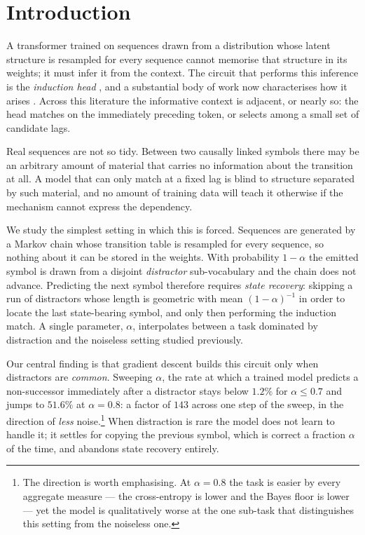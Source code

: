 \section{Introduction}
\label{sec:intro}

A transformer trained on sequences drawn from a distribution whose latent structure is resampled
for every sequence cannot memorise that structure in its weights; it must infer it from the
context. The circuit that performs this inference is the \emph{induction head}
\citep{elhage2021,olsson2022}, and a substantial body of work now characterises how it arises
\citep{bietti2023,edelman2024,nichani2024}. Across this literature the informative context is
adjacent, or nearly so: the head matches on the immediately preceding token, or selects among a
small set of candidate lags.

Real sequences are not so tidy. Between two causally linked symbols there may be an arbitrary
amount of material that carries no information about the transition at all. A model that can only
match at a fixed lag is blind to structure separated by such material, and no amount of training
data will teach it otherwise if the mechanism cannot express the dependency.

We study the simplest setting in which this is forced. Sequences are generated by a Markov chain
whose transition table is resampled for every sequence, so nothing about it can be stored in the
weights. With probability $1-\alpha$ the emitted symbol is drawn from a disjoint
\emph{distractor} sub-vocabulary and the chain does not advance. Predicting the next symbol
therefore requires \emph{state recovery}: skipping a run of distractors whose length is
geometric with mean $(1-\alpha)^{-1}$ in order to locate the last state-bearing symbol, and only
then performing the induction match. A single parameter, $\alpha$, interpolates between a task
dominated by distraction and the noiseless setting studied previously.

Our central finding is that gradient descent builds this circuit only when distractors are
\emph{common}. Sweeping $\alpha$, the rate at which a trained model predicts a non-successor
immediately after a distractor stays below $1.2\%$ for $\alpha\le0.7$ and jumps to $51.6\%$ at
$\alpha=0.8$: a factor of $143$ across one step of the sweep, in the direction of \emph{less}
noise.\footnote{The direction is worth emphasising. At $\alpha=0.8$ the task is easier by every
aggregate measure --- the cross-entropy is lower and the Bayes floor is lower --- yet the model is
qualitatively worse at the one sub-task that distinguishes this setting from the noiseless one.}
When distraction is rare the model does not learn to handle it; it settles for copying the
previous symbol, which is correct a fraction $\alpha$ of the time, and abandons state recovery
entirely.

